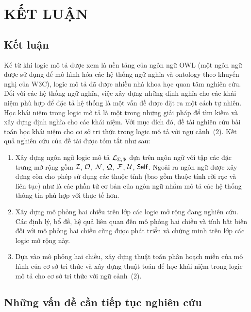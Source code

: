 \chapter*{KẾT LUẬN}
\label{ChapterKetLuan}
\thispagestyle{fancy}
\section*{Kết luận}
Kể từ khi logic mô tả được xem là nền tảng của ngôn ngữ OWL (một ngôn ngữ được sử dụng để mô hình hóa các hệ thống ngữ nghĩa và ontology theo khuyến nghị của W3C), logic mô tả đã được nhiều nhà khoa học quan tâm nghiên cứu. Đối với các hệ thống ngữ nghĩa, việc xây dựng những định nghĩa cho các khái niệm phù hợp để đặc tả hệ thống là một vấn đề được đặt ra một cách tự nhiên. Học khái niệm trong logic mô tả là một trong những giải pháp để tìm kiếm và xây dựng định nghĩa cho các khái niệm. Với mục đích đó, đề tài nghiên cứu bài toán học khái niệm cho cơ sở tri thức trong logic mô tả với ngữ cảnh~(2). Kết quả nghiên cứu của đề tài được tóm tắt như sau:
\begin{enumerate}
	\item Xây dựng ngôn ngữ logic mô tả $\mathcal{L}_{\Sigma,\Phi}$ dựa trên ngôn ngữ \ALCreg với tập các đặc trưng mở rộng gồm $\mathcal{I}$, $\mathcal{O}$, $\mathcal{N}$, $\mathcal{Q}$, $\mathcal{F}$, $\mathcal{U}$, $\mathsf{Self}$. Ngoài ra ngôn ngữ được xây dựng còn cho phép sử dụng các thuộc tính (bao gồm thuộc tính rời rạc và liên tục) như là các phần tử cơ bản của ngôn ngữ nhằm mô tả các hệ thống thông tin phù hợp với thực tế hơn.
	
	\item Xây dựng mô phỏng hai chiều trên lớp các logic mở rộng đang nghiên cứu. Các định lý, bổ đề, hệ quả liên quan đến mô phỏng hai chiều và tính bất biến đối với mô phỏng hai chiều cũng được phát triển và chứng minh trên lớp các logic mở rộng này.
	
	\item Dựa vào mô phỏng hai chiều, xây dựng thuật toán phân hoạch miền của mô hình của cơ sở tri thức và xây dựng thuật toán \BBCLearnS để học khái niệm trong logic mô tả cho cơ sở tri thức với ngữ cảnh~(2).
\end{enumerate}

\section*{Những vấn đề cần tiếp tục nghiên cứu}

